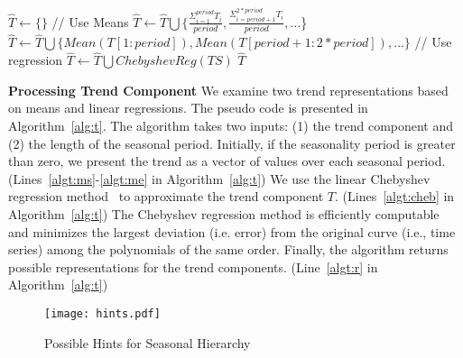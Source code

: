 \documentclass[10pt,conference,letterpaper]{IEEEtran}
\begin{document}
 

\begin{algorithm}[tp]
\caption{Find Possible Representations for Trend}
\label{alg:t}
\begin{algorithmic}[1]
\State $\hat{T} \gets  \{\}$
  \label{algt:ms}
\State // Use Means
\State $\hat{T} \gets \hat{T} \bigcup \{ \frac{\Sigma_{i=1}^{period} {T_i}}{period}, \frac{\Sigma_{i=period+1}^{2*period} {T_i}}{period}, \dots $\}
\State $\hat{T} \gets \hat{T} \bigcup  \{ Mean(T[1:period]), Mean(T[period+1:2*period]),  \dots \} $
\EndIf  \label{algt:me}
\State // Use regression
\State $\hat{T} \gets \hat{T} \bigcup ChebyshevReg(TS)$ \label{algt:cheb}
 $\hat{T}$\label{algt:r}
\EndProcedure
\end{algorithmic}
\end{algorithm}

{\bf Processing Trend Component}
\label{sec:nonseasonal}
We examine two  trend representations based on means and linear regressions. The pseudo code is presented in Algorithm~\ref{alg:t}. The algorithm takes two inputs: (1) the trend component and (2) the length of the seasonal period. Initially, if the seasonality period is greater than zero,  we present the trend as a vector of  values over each seasonal period. (Lines~\ref{algt:ms}-\ref{algt:me} in Algorithm~\ref{alg:t}) 
We use  the linear Chebyshev regression method~\cite{cheb} to approximate the trend component $T$. (Lines~\ref{algt:cheb} in Algorithm~\ref{alg:t}) The Chebyshev regression method is efficiently computable and 
minimizes the largest deviation (i.e. error) from the original curve (i.e., time series) among the polynomials of the same order. Finally, the algorithm returns possible representations for the trend components. (Line~\ref{algt:r} in Algorithm~\ref{alg:t})
\begin{figure}
\center
\texttt{[image: hints.pdf]}
\caption{Possible Hints for Seasonal Hierarchy}
\label{fig:hints}
\end{figure}
\end{document}
